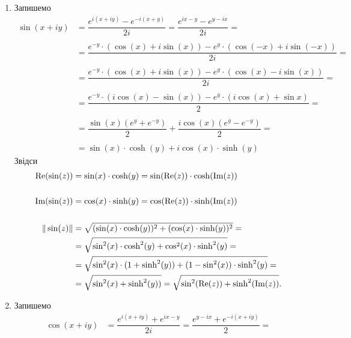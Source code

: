 \begin{solution}
    \begin{enumerate}
        \item 
        Запишемо
        \begin{align*}
            \sin (x + iy) &= \dfrac{e^{i(x + iy)} - e^{-i(x + y)}}{2i} = \dfrac{e^{ix - y} - e^{y - ix}}{2i} = \\
            \\
            &= \dfrac{e^{-y} \cdot (\cos (x) + i \sin(x)) - e^{y}\cdot(\cos(-x) + i\sin(-x))}{2i} = \\
            \\
            &= \dfrac{e^{-y} \cdot (\cos (x) + i \sin(x)) - e^{y}\cdot(\cos(x) - i\sin(x))}{2i} = \\
            \\
            &= \dfrac{e^{-y} \cdot (i \cos (x) - \sin(x)) - e^{y}\cdot(i \cos(x) + \sin x)}{2} = \\
            \\
            &= \dfrac{\sin (x) (e^y + e^{-y})}{2} + \dfrac{i \cos (x) (e^y - e^{-y})}{2} = \\
            \\
            &= \sin (x) \cdot \cosh(y) + i \cos(x) \cdot \sinh(y)
        \end{align*}
        Звідси 
        \begin{align*}
            \operatorname{Re}(\sin(z)) &= \sin (x) \cdot \cosh(y) = \sin (\operatorname{Re}(z)) \cdot \cosh(\operatorname{Im}(z)) \\
            \\
            \operatorname{Im}(\sin(z)) &= \cos (x) \cdot \sinh(y) = \cos (\operatorname{Re}(z)) \cdot \sinh(\operatorname{Im}(z)) \\
            \\
            \|\sin(z)\| &= \sqrt{(\sin(x) \cdot \cosh(y))^2 + (\cos(x) \cdot \sinh(y))^2} = \\
            &= \sqrt{\sin^2(x) \cdot \cosh^2(y) + \cos^2(x) \cdot \sinh^2(y)} = \\
            &= \sqrt{\sin^2(x) \cdot (1 + \sinh^2(y)) + (1 - \sin^2(x)) \cdot \sinh^2(y)} = \\
            &= \sqrt{\sin^2(x) + \sinh^2(y))} = \sqrt{\sin^2(\operatorname{Re}(z)) + \sinh^2(\operatorname{Im}(z))}.
        \end{align*}
        \item 
        Запишемо
        \begin{align*}
            \cos (x + iy) &= \dfrac{e^{i(x + iy)} + e^{ix - y}}{2i} = \dfrac{e^{y - ix} + e^{-i(x + iy)}} 2 = \\

\end{align*}
\end{enumerate}
\end{solution}
